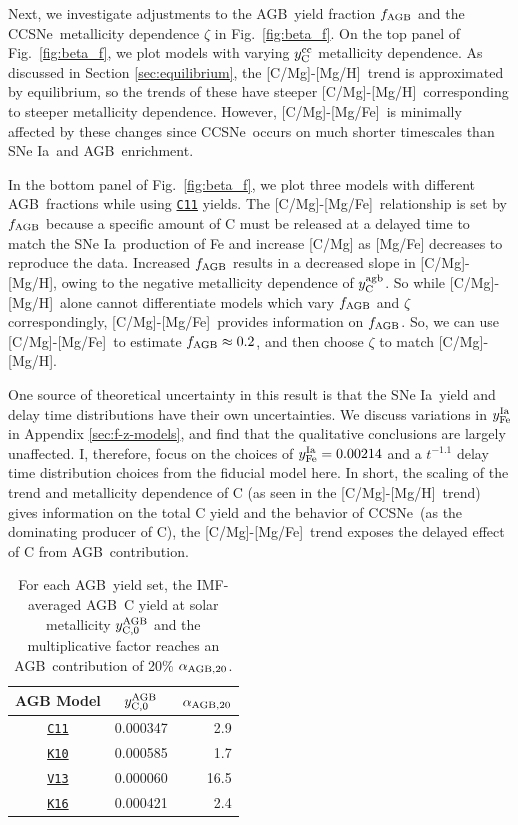 \documentclass[fleqn,usenatbib]{mnras}
\newcommand{\cxi}{\texttt{\hyperlink{C11}{C11}}}
\newcommand{\kx}{\texttt{\hyperlink{K10}{K10}}}
\newcommand{\kxvi}{\texttt{\hyperlink{K16}{K16}}}
\newcommand{\vxiii}{\texttt{\hyperlink{V13}{V13}}}
\newcommand{\cc}{CCSNe}
\newcommand{\agb}{AGB}
\newcommand{\ia}{SNe Ia}
\newcommand{\imf}{IMF}
\newcommand{\caah}{[C/Mg]-[Mg/H]}
\newcommand{\caafe}{[C/Mg]-[Mg/Fe]}
\newcommand{\Ycc}{\ensuremath{y_{\rm C}^{\rm cc}}}
\newcommand{\Ycagb}{\ensuremath{y_{\rm C}^{\rm agb}}}
\begin{document}
Next, we investigate adjustments to the \agb\ yield fraction $f_{\rm AGB}$ and the \cc\ metallicity dependence $\zeta$ in Fig.~\ref{fig:beta_f}. On the top panel of Fig.~\ref{fig:beta_f}, we plot models with varying $\Ycc$ metallicity dependence. As discussed in Section \ref{sec:equilibrium}, the \caah~trend is approximated by equilibrium, so the trends of these have steeper \caah~corresponding to steeper metallicity dependence. However, \caafe~is minimally affected by these changes since \cc\ occurs on much shorter timescales than \ia\ and \agb\ enrichment.

In the bottom panel of Fig.~\ref{fig:beta_f}, we plot three models with different \agb\ fractions while using \cxi{} yields.  The \caafe~relationship is set by $f_{\rm AGB}$ because a specific amount of C must be released at a delayed time to match the \ia\ production of Fe and increase [C/Mg] as [Mg/Fe] decreases to reproduce the data.
Increased $f_{\rm AGB}$ results in a decreased slope in \caah, owing to the negative metallicity dependence of $\Ycagb$. So while \caah~alone cannot differentiate models which vary $f_{\rm AGB}$ and $\zeta$ correspondingly, \caafe~provides information on $f_{\rm AGB}$. So, we can use \caafe~to estimate $f_{\rm AGB}\approx 0.2$, and then choose $\zeta$ to match \caah.

One source of theoretical uncertainty in this result is that the \ia\ yield and delay time distributions have their own uncertainties. We discuss variations in $y_{\rm Fe}^{\rm Ia}$ in Appendix \ref{sec:f-z-models}, and find that the qualitative conclusions are largely unaffected. I, therefore, focus on the choices of $y_{\rm Fe}^{\rm Ia} = 0.00214$ and a $t^{-1.1}$ delay time distribution choices from the fiducial model here.
In short, the scaling of the trend and metallicity dependence of C (as seen in
the \caah\ trend) gives information on the total C yield and the behavior of \cc\ (as the dominating producer of C), the \caafe\ trend exposes the delayed effect of C from \agb\ contribution.

\begin{table}
	\centering
    \caption[Low-Mass Stellar Carbon Yields at Solar Metallicity]{For each \agb\ yield set, the \imf-averaged \agb\ C yield at solar metallicity $y_{\rm C, 0}^{\rm AGB}$ and the multiplicative factor reaches an \agb\ contribution of 20\% $\alpha_{\rm AGB, 20}$.}
	\label{tab:alpha_agb}
	\begin{tabular}{ccr} %
		\hline 
		AGB Model & $y_{\rm C, 0}^{\rm AGB}$ & $\alpha_{\rm AGB, 20}$\\
        \hline
        \cxi & 0.000347 & 2.9\\
        \kx & 0.000585 & 1.7\\
        \vxiii & 0.000060 & 16.5\\
        \kxvi & 0.000421 & 2.4\\
		\hline
	\end{tabular}
\end{table}
\end{document}
